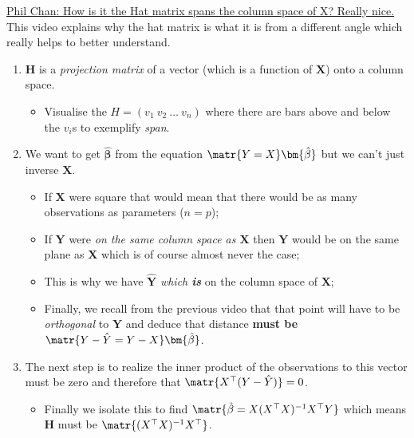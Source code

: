 \documentclass[12pt, titlepage, french]{report}
\begin{document}
\begin{YTB_SUMM}{\href{https://www.youtube.com/watch?v=l2xG_yehq0k&t=146s}{Phil Chan: How is it the Hat matrix spans the column space of X? Really nice.}}
This video explains why the hat matrix is what it is from a different angle which really helps to better understand.
\begin{enumerate}
	\item	$\bm{H}$ is a \textit{projection matrix} of a vector (which is a function of $\bm{X}$) onto a column space.
	\begin{itemize}
	\item	Visualise the $H = (v_1 \ v_2  \ \dots \ v_n)$ where there are bars above and below the $v_{i}$s to exemplify \textit{span}.	
	\end{itemize}
	\item	We want to get $\bm{\hat{\beta}}$ from the equation $\matr{Y = X }\bm{\hat{\beta}}$ but we can't just inverse $\bm{X}$.
	\begin{itemize}
		\item	If $\bm{X}$ were square that would mean that there would be as many observations as parameters ($n = p$);
		\item	If $\bm{Y}$ were \og \textit{on the same column space as $\bm{X}$} \fg{} then $\bm{Y}$ would be on the same plane as $\bm{X}$ which is of course almost never the case;
		\item	This is why we have $\bm{\hat{Y}}$ \textit{which \textbf{is}} on the column space of $\bm{X}$;
		\item	Finally, we recall from the previous video that that point will have to be \textit{orthogonal} to $\bm{Y}$ and deduce that distance \textbf{must be $\matr{Y - \hat{Y} = Y - X} \bm{\hat{\beta}}$}.
	\end{itemize}
	\item	The next step is to realize the inner product of the observations to this vector must be zero and therefore that $\matr{X^{\top}(Y - \hat{Y})} = 0$.
	\begin{itemize}
		\item	Finally we isolate this to find $\matr{\hat{\beta} = X(X^{\top}X)^{-1}X^{\top}Y}$ which means $\bm{H}$ must be $\matr{(X^{\top}X)^{-1}X^{\top}}$.
	\end{itemize}
\end{enumerate}
\end{YTB_SUMM}
\end{document}
